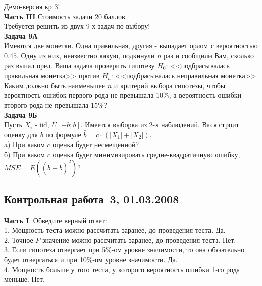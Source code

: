 \documentclass[pdftex,12pt,a4paper]{article}
\begin{document}
Демо-версия кр 3! \\
\textbf{Часть III} Стоимость задачи 20 баллов. \\

Требуется решить \textbf{} из двух 9-х задач по
выбору! \\

\textbf{Задача 9А} \\
Имеются две монетки. Одна правильная, другая - выпадает орлом с
вероятностью $0.45$. Одну из них, неизвестно какую, подкинули $n$
раз и сообщили Вам, сколько раз выпал орел. Ваша задача проверить
гипотезу $H_{0}$: <<подбрасывалась правильная монетка>> против
$H_{a}$:
<<подбрасывалась неправильная монетка>>. \\
Каким должно быть наименьшее $n$ и критерий выбора гипотезы, чтобы
вероятность ошибок первого рода не превышала 10\%, а вероятность
ошибки второго рода не превышала 15\%? \\

\textbf{Задача 9Б} \\
Пусть $X_{i}$ - iid, $U[-b;b]$. Имеется выборка из 2-х наблюдений. Вася строит оценку для $b$ по формуле $\hat{b}=c\cdot (|X_{1}|+|X_{2}|)$. \\
a) При каком $c$ оценка будет несмещенной? \\
б) При каком $c$ оценка будет минимизировать средне-квадратичную ошибку, $MSE=E((\hat{b}-b)^{2})$? \\


\subsection{Контрольная работа \No\,3, 01.03.2008}

\textbf{Часть I}. Обведите верный ответ: \\

1. Мощность теста можно рассчитать заранее, до проведения теста. Да.  \\

2. Точное $P$-значение можно рассчитать заранее, до проведения теста. Нет. \\

3. Если гипотеза отвергает при 5\%-ом уровне значимости, то
она обязательно будет отвергаться и при 10\%-ом уровне значимости. Да. \\

4. Мощность больше у того теста, у которого вероятность ошибки
1-го рода меньше.  Нет. \\
\end{document}
